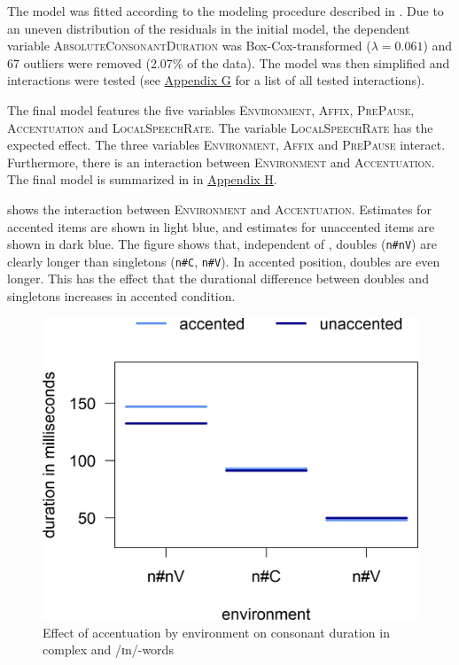  The model was fitted according to the modeling procedure described in . Due to an uneven distribution of the residuals in the initial model, the dependent variable \textsc{AbsoluteConsonantDuration} was Box-Cox-transformed ($\lambda = 0.061$) and 67 outliers were removed (2.07\% of the data).
The model was then simplified and interactions were tested (see \hyperref[Appendix G Summaries of tested interactions in experimental study]{Appendix G} for a list of all tested interactions).


The final model features the five variables \textsc{Environment}, \textsc{Affix}, \textsc{PrePause}, \textsc{Accentuation} and \textsc{LocalSpeechRate}. The variable \textsc{LocalSpeechRate} has the expected effect. The three variables \textsc{Environment}, \textsc{Affix} and \textsc{PrePause} interact. Furthermore, there is an interaction between \textsc{Environment} and \textsc{Accentuation}. The final model is summarized in  in \hyperref[Appendix H: Model Summaries Experiment]{Appendix H}.


 shows the interaction between \textsc{Environment} and \textsc{Accentuation}. Estimates for accented items are shown in light blue, and estimates  for unaccented items are shown in dark blue. The figure shows that, independent of , doubles (\texttt{n\#nV}) are clearly longer than singletons (\texttt{n\#C}, \texttt{n\#V}). In accented position, doubles are even longer. This has the effect that the durational difference between doubles and singletons increases in accented condition.



\begin{figure}
	
	\includegraphics [scale=0.5] {images/Experiment/UnInInterEnvAcc}
	\caption{Effect of accentuation by environment on consonant duration in complex  and /ɪn/-words}
	\label{fig: Un In experiment Env and accent}
\end{figure}

